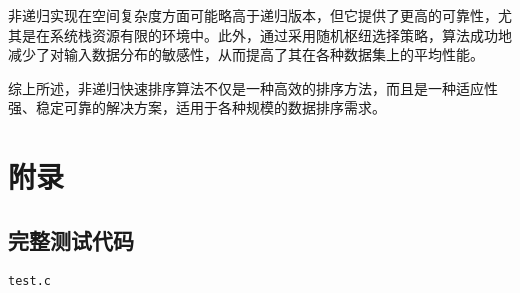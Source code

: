\documentclass[12pt]{article}
\begin{document}
非递归实现在空间复杂度方面可能略高于递归版本，但它提供了更高的可靠性，尤其是在系统栈资源有限的环境中。此外，通过采用随机枢纽选择策略，算法成功地减少了对输入数据分布的敏感性，从而提高了其在各种数据集上的平均性能。

综上所述，非递归快速排序算法不仅是一种高效的排序方法，而且是一种适应性强、稳定可靠的解决方案，适用于各种规模的数据排序需求。

\newpage

\appendix

\section{附录}

\subsection{完整测试代码}

\texttt{test.c}
\end{document}
